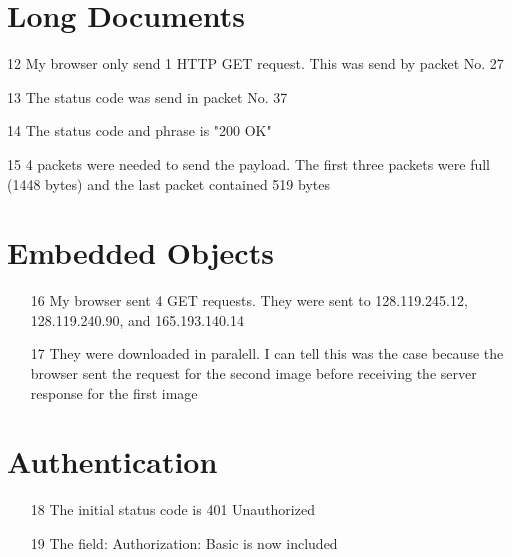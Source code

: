 \documentclass[11pt]{article}
\theoremstyle{definition}
\begin{document}
\section*{Long Documents}
\begin{enumeration}
	\item[12] My browser only send 1 HTTP GET request.  This was send by packet No. 27\\

	\item[13] The status code was send in packet No. 37\\

	\item[14] The status code and phrase is "200 OK"\\

	\item[15] 4 packets were needed to send the payload.  The first three packets were full (1448 bytes) and the last packet contained 519 bytes\\
\end{enumeration}

\section*{Embedded Objects}
\begin{enumerate}
	\item[16] My browser sent 4 GET requests.  They were sent to 128.119.245.12, 128.119.240.90, and 165.193.140.14

	\item[17] They were downloaded in paralell.  I can tell this was the case because the browser sent the request for the second image before receiving the server response for the first image\\
\end{enumerate}

\section*{Authentication}
\begin{enumerate}
	\item[18] The initial status code is 401 Unauthorized

	\item[19] The field: Authorization: Basic is now included
\end{enumerate}
\end{document}
